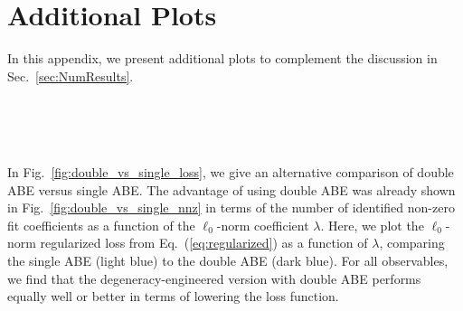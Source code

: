 \documentclass[aps,prd,twocolumn, superscriptaddress,preprintnumbers, nofootinbib,longbibliography,floatfix]{revtex4-2}
\DeclareRobustCommand{\Sec}[1]{Sec.~\ref{#1}}
\DeclareRobustCommand{\Tab}[1]{Table~\ref{#1}}
\DeclareRobustCommand{\Fig}[1]{Fig.~\ref{#1}}
\DeclareRobustCommand{\Eq}[1]{Eq.~(\ref{#1})}
\begin{document}
\section{Additional Plots}
\label{app:additional_plots}


In this appendix, we present additional plots to complement the discussion in \Sec{sec:NumResults}.

\begin{figure*}
\centering
{}
\\
\\
\\
	\caption{
	Same as \Fig{fig:double_vs_single_nnz}, but plotting the $\ell_0$-norm regularized loss function in \Eq{eq:regularized} as a function of the $\ell_0$-norm coefficient $\lambda$. The (a)--(l) are defined in \Tab{tab:observables}.}
	\label{fig:double_vs_single_loss}
\end{figure*}


In \Fig{fig:double_vs_single_loss}, we give an alternative comparison of double ABE versus single ABE.
%
The advantage of using double ABE was already shown in \Fig{fig:double_vs_single_nnz} in terms of the number of identified non-zero fit coefficients as a function of the $\ell_0$-norm coefficient $\lambda$.
%
Here, we plot the $\ell_0$-norm regularized loss from \Eq{eq:regularized} as a function of $\lambda$, comparing the single ABE (light blue) to the double ABE (dark blue). 
%
For all observables, we find that the degeneracy-engineered version with double ABE performs equally well or better in terms of lowering the loss function.
\end{document}
